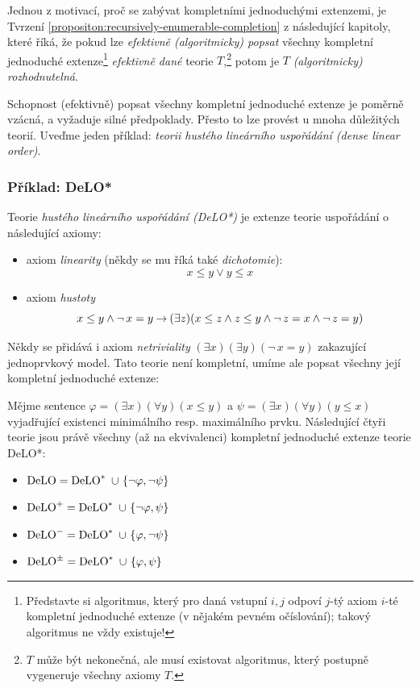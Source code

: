 \begin{remark}
    Jednou z motivací, proč se zabývat kompletními jednoduchými extenzemi, je Tvrzení \ref{propositon:recursively-enumerable-completion} z následující kapitoly, které říká, že pokud lze \emph{efektivně (algoritmicky) popsat} všechny kompletní jednoduché extenze\footnote{Představte si algoritmus, který pro daná vstupní $i,j$ odpoví $j$-tý axiom $i$-té kompletní jednoduché extenze (v nějakém pevném očíslování); takový algoritmus ne vždy existuje!} \emph{efektivně dané} teorie $T$,\footnote{$T$ může být nekonečná, ale musí existovat algoritmus, který postupně vygeneruje všechny axiomy $T$.} potom je $T$ \emph{(algoritmicky) rozhodnutelná}.
\end{remark}


Schopnost (efektivně) popsat všechny kompletní jednoduché extenze je poměrně vzácná, a vyžaduje silné předpoklady. Přesto to lze provést u mnoha důležitých teorií. Uveďme jeden příklad: \emph{teorii hustého lineárního uspořádání (dense linear order)}.

\subsubsection{Příklad: DeLO*}

Teorie \emph{hustého lineárního uspořádání (DeLO*)}  je extenze teorie uspořádání o následující axiomy: 
\begin{itemize}
    \item axiom \emph{linearity} (někdy se mu říká také \emph{dichotomie}):
    $$
    x\leq y\lor y\leq x
    $$
    \item axiom \emph{hustoty}
    $$
    {x\leq y}\land{\neg\,x=y}\mathbin{\rightarrow}(\exists z)(x\leq z\land z\leq y\land\neg\,z=x\land\neg\,z=y)
    $$
\end{itemize}
Někdy se přidává i axiom \emph{netriviality} $(\exists x)(\exists y)(\neg\,x=y)$ zakazující jednoprvkový model. Tato teorie není kompletní, umíme ale popsat všechny její kompletní jednoduché extenze:

\begin{proposition}
Mějme sentence $\varphi=(\exists x)(\forall y)(x\leq y)$ a $\psi=(\exists x)(\forall y)(y\leq x)$ vyjadřující existenci minimálního resp. maximálního prvku. Následující čtyři teorie jsou právě všechny (až na ekvivalenci) kompletní jednoduché extenze teorie DeLO*:
\begin{itemize}
    \item $\operatorname{DeLO} = \operatorname{DeLO}^*\ \cup \ \{\neg\varphi
    ,\neg\psi\}$
    \item $\DeLO^+ = \DeLO^*\ \cup \ \{\neg\varphi
    ,\psi\}$
    \item $\operatorname{DeLO}^- = \operatorname{DeLO}^*\ \cup \ \{\varphi
    ,\neg\psi\}$
    \item $\operatorname{DeLO}^\pm = \operatorname{DeLO}^*\ \cup \ \{\varphi
    ,\psi\}$        
\end{itemize}
\end{proposition}

